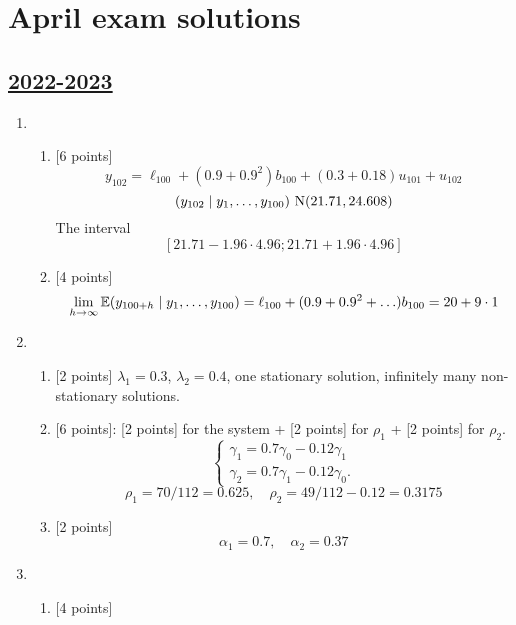 
\newpage
\thispagestyle{empty}
\section{April exam solutions}
 

\subsection[2022-2023]{\hyperref[sec:kr_03_2022_2023]{2022-2023}}
\label{sec:sol_kr_03_2022_2023} %

\begin{enumerate}
    \item 
\begin{enumerate}
    \item {[6 points]}
    \[
        y_{102}= \ell_{100} + (0.9 + 0.9^2) b_{100} + (0.3 + 0.18)u_{101} + u_{102}    
        \]
        \[
        (y_{102} \mid y_1, \ldots, y_{100}) ~ \mathrm{N}(21.71, 24.608)    
        \]
        The interval
        \[
        [21.71 - 1.96 \cdot 4.96;21.71 + 1.96 \cdot 4.96]    
        \]
    \item {[4 points]}
    \[
    \lim_{h\to\infty} \operatorname{\mathbb{E}}(y_{100+h} \mid y_1, \ldots, y_{100}) = \ell_{100} + (0.9 + 0.9^2 +\ldots) b_{100} = 20 + 9\cdot 1    
    \]    
\end{enumerate}
\item 
\begin{enumerate}
    \item {[2 points]} $\lambda_1 = 0.3$, $\lambda_2 = 0.4$, one stationary solution, infinitely many non-stationary solutions. 
    \item {[6 points]}: {[2 points] for the system} + {[2 points] for $\rho_1$} + {[2 points] for $\rho_2$}.
    \[
        \begin{cases}
            \gamma_1 = 0.7 \gamma_0  - 0.12 \gamma_1 \\
            \gamma_2 = 0.7 \gamma_1 - 0.12 \gamma_0. 
        \end{cases}
    \]
    \[
    \rho_1 = 70/112 = 0.625, \quad \rho_2 = 49/112 - 0.12 = 0.3175    
    \]
    \item {[2 points]}
    \[
    \alpha_1 = 0.7, \quad \alpha_2 = 0.37    
    \]
\end{enumerate}
\item 
\begin{enumerate}
    \item {[4 points]}
    \[
\]
\end{enumerate}
\end{enumerate}
